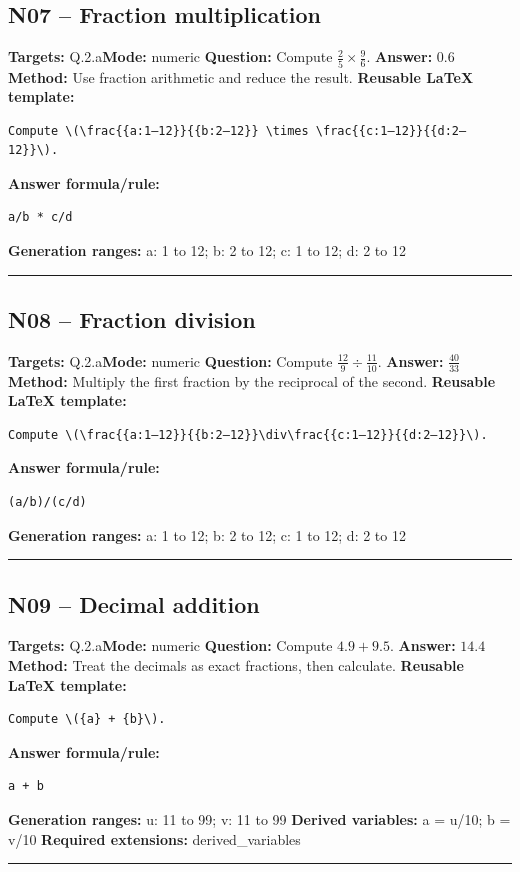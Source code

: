 \documentclass[11pt]{article}
\begin{document}
\subsection{N07 -- Fraction multiplication}
\textbf{Targets:} Q.2.a\quad\textbf{Mode:} numeric
\textbf{Question:} Compute \(\frac{2}{5} \times \frac{9}{6}\).
\textbf{Answer:} \(0.6\)
\textbf{Method:} Use fraction arithmetic and reduce the result.
\textbf{Reusable LaTeX template:}
\begin{verbatim}
Compute \(\frac{{a:1–12}}{{b:2–12}} \times \frac{{c:1–12}}{{d:2–12}}\).
\end{verbatim}
\textbf{Answer formula/rule:}
\begin{verbatim}
a/b * c/d
\end{verbatim}
\textbf{Generation ranges:} a: 1 to 12; b: 2 to 12; c: 1 to 12; d: 2 to 12
\medskip\hrule\medskip
\subsection{N08 -- Fraction division}
\textbf{Targets:} Q.2.a\quad\textbf{Mode:} numeric
\textbf{Question:} Compute \(\frac{12}{9}\div\frac{11}{10}\).
\textbf{Answer:} \(\frac{40}{33}\)
\textbf{Method:} Multiply the first fraction by the reciprocal of the second.
\textbf{Reusable LaTeX template:}
\begin{verbatim}
Compute \(\frac{{a:1–12}}{{b:2–12}}\div\frac{{c:1–12}}{{d:2–12}}\).
\end{verbatim}
\textbf{Answer formula/rule:}
\begin{verbatim}
(a/b)/(c/d)
\end{verbatim}
\textbf{Generation ranges:} a: 1 to 12; b: 2 to 12; c: 1 to 12; d: 2 to 12
\medskip\hrule\medskip
\subsection{N09 -- Decimal addition}
\textbf{Targets:} Q.2.a\quad\textbf{Mode:} numeric
\textbf{Question:} Compute \(4.9 + 9.5\).
\textbf{Answer:} \(14.4\)
\textbf{Method:} Treat the decimals as exact fractions, then calculate.
\textbf{Reusable LaTeX template:}
\begin{verbatim}
Compute \({a} + {b}\).
\end{verbatim}
\textbf{Answer formula/rule:}
\begin{verbatim}
a + b
\end{verbatim}
\textbf{Generation ranges:} u: 11 to 99; v: 11 to 99
\textbf{Derived variables:} a = u/10; b = v/10
\textbf{Required extensions:} derived\_variables
\medskip\hrule\medskip
\end{document}

